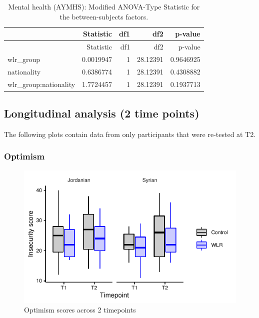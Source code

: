 \documentclass[]{article}
\begin{document}
\begin{longtable}[]{@{}lrrrr@{}}
\caption{Mental health (AYMHS): Modified ANOVA-Type Statistic for the
between-subjects factors.}\tabularnewline
\toprule
& Statistic & df1 & df2 & p-value\tabularnewline
\midrule
\endfirsthead
\toprule
& Statistic & df1 & df2 & p-value\tabularnewline
\midrule
\endhead
wlr\_group & 0.0019947 & 1 & 28.12391 & 0.9646925\tabularnewline
nationality & 0.6386774 & 1 & 28.12391 & 0.4308882\tabularnewline
wlr\_group:nationality & 1.7724457 & 1 & 28.12391 &
0.1937713\tabularnewline
\bottomrule
\end{longtable}

\newpage

\hypertarget{longitudinal-analysis-2-time-points}{%
\subsection{Longitudinal analysis (2 time
points)}\label{longitudinal-analysis-2-time-points}}

The following plots contain data from only participants that were
re-tested at T2.

\hypertarget{optimism-1}{%
\subsubsection{Optimism}\label{optimism-1}}

\begin{figure}[H]

{\centering \includegraphics{WLR-analyses-report_files/figure-latex/unnamed-chunk-31-1} 

}

\caption{Optimism scores across 2 timepoints}\label{fig:unnamed-chunk-31}
\end{figure}
\end{document}
